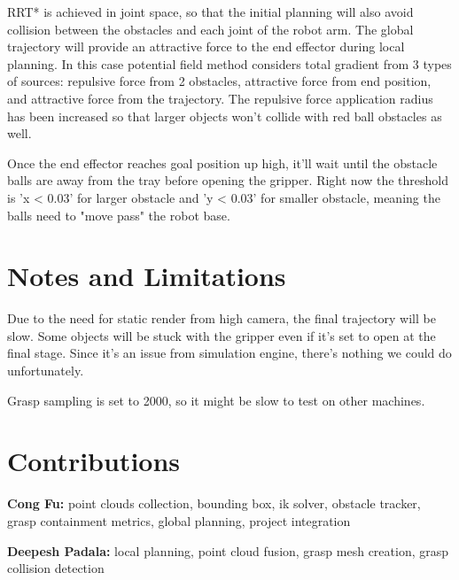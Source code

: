 \documentclass[
	english,
	accentcolor=11d,%
	type=intern,
	marginpar=false,
    logofile=media/PEARLTUDA.png
	]{tudapub}
\begin{document}
RRT* is achieved in joint space, so that the initial planning will also avoid collision between the obstacles and each joint of the robot arm. The global trajectory will provide an attractive force to the end effector during local planning. In this case potential field method considers total gradient from 3 types of sources: repulsive force from 2 obstacles, attractive force from end position, and attractive force from the trajectory. The repulsive force application radius has been increased so that larger objects won't collide with red ball obstacles as well.

Once the end effector reaches goal position up high, it'll wait until the obstacle balls are away from the tray before opening the gripper. Right now the threshold is 'x < 0.03' for larger obstacle and 'y < 0.03' for smaller obstacle, meaning the balls need to "move pass" the robot base.

\section{Notes and Limitations}

Due to the need for static render from high camera, the final trajectory will be slow. Some objects will be stuck with the gripper even if it's set to open at the final stage. Since it's an issue from simulation engine, there's nothing we could do unfortunately.

Grasp sampling is set to 2000, so it might be slow to test on other machines.

\section{Contributions}

\noindent\textbf{Cong Fu:} point clouds collection, bounding box, ik solver, obstacle tracker, grasp containment metrics, global planning, project integration

\noindent\textbf{Deepesh Padala:} local planning, point cloud fusion, grasp mesh creation, grasp collision detection
\end{document}
